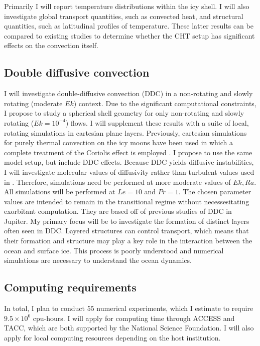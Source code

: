 \documentclass{article}
\begin{document}
Primarily I will report temperature distributions within the icy shell. I will also investigate global transport quantities, such as convected heat, and structural quantities, such as latitudinal profiles of temperature. 
These latter results can be compared to existing studies \citep{dL23,kS19,jK22} to determine whether the CHT setup has significant effects on the convection itself.
\subsection{Double diffusive convection}
I will investigate double-diffusive convection (DDC) in a non-rotating and slowly rotating (moderate $Ek$) context. Due to the significant computational constraints, I propose to study a spherical shell geometry for only non-rotating and slowly rotating ($Ek = 10^{-4}$) flows. I will supplement these results with a suite of local, rotating simulations in cartesian plane layers. Previously, cartesian simulations for purely thermal convection on the icy moons have been used in which a complete treatment of the Coriolis effect is employed \citep{sB22}. I propose to use the same model setup, but include DDC effects. 
Because DDC yields diffusive instabilities, I will investigate molecular values of diffusivity rather than turbulent values used in \citep{sB22}. Therefore, simulations need be performed at more moderate values of $Ek, Ra$. 
All simulations will be performed at $Le = 10$ and $Pr = 1$. 
The chosen parameter values are intended to remain in the transitional regime without necessesitating exorbitant computation. They are based off of previous studies of DDC in Jupiter\citep{jF24,rM17}. 
My primary focus will be to investigate the formation of distinct layers often seen in DDC.
Layered structures can control transport, which means that their formation and structure may play a key role in the interaction between the ocean and surface ice. This process is poorly understood and numerical simulations are necessary to understand the ocean dynamics. 
\subsection{Computing requirements}
In total, I plan to conduct $55$ numerical experiments, which I estimate to require $9.5\times 10^{6}$ cpu-hours. I will apply for computing time through ACCESS and TACC, which are both supported by the National Science Foundation. I will also apply for local computing resources depending on the host institution.
\begin{spacing}{0.4}
\begin{multicols}{2}

\printbibliography

\end{multicols}
\end{spacing}
\end{document}
